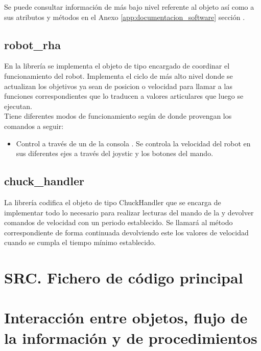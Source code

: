         Se puede consultar información de más bajo nivel referente al objeto  así como a sus atributos y métodos en el Anexo \ref{app:documentacion_software} sección \completar.
        
    \subsection{robot\_rha} \label{subsec:SW:lib:robot_rha}
        En la librería  se implementa el objeto de tipo  encargado de coordinar el funcionamiento del robot. Implementa el ciclo de más alto nivel donde se actualizan los objetivos ya sean de posicion o velocidad para llamar a las funciones correspondientes que lo traducen a valores articulares que luego se ejecutan.
        \\ 
        
        Tiene diferentes modos de funcionamiento según de donde provengan los comandos a seguir:
        \begin{itemize}
            \item Control a través de un  de la consola . Se controla la velocidad del robot en sus diferentes ejes a través del joystic y los botones del mando. 
        
        \end{itemize}
        
    \subsection{chuck\_handler} \label{subsec:SW:lib:chuck_handler}
        La librería  codifica el objeto de tipo ChuckHandler que se encarga de implementar todo lo necesario para realizar lecturas del mando  de la  y devolver comandos de velocidad con un periodo establecido. Se llamará al método correspondiente de forma continuada devolviendo este los valores de velocidad cuando se cumpla el tiempo mínimo establecido.
        
\section{SRC. Fichero de código principal} \label{sec:SW:src}

\section{Interacción entre objetos, flujo de la información y de procedimientos} \label{sec:SW:interacion_informacion_proced}

